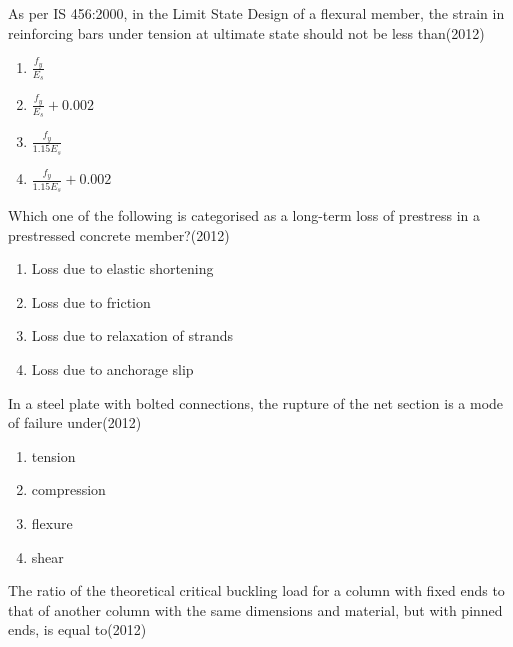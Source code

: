 	\item As per IS 456:2000, in the Limit State Design of a flexural member, the strain in reinforcing bars under tension at ultimate state should not be less than\hfill{(2012)}

  \begin{multicols}{4}
			\begin{enumerate}
\item $\frac{f_{y}}{E_{s}}$
\item $\frac{f_{y}}{E_{s}}+0.002$
\item $\frac{f_{y}}{1.15 E_{s}}$
\item $\frac{f_{y}}{1.15 E_{s}}+0.002$
\end{enumerate}
		\end{multicols}


	\item Which one of the following is categorised as a long-term loss of prestress in a prestressed concrete member?\hfill{(2012)}

   \begin{multicols}{1}
			\begin{enumerate}
  \item Loss due to elastic shortening
\item Loss due to friction
\item  Loss due to relaxation of strands
\item  Loss due to anchorage slip
\end{enumerate}
		\end{multicols}


	\item In a steel plate with bolted connections, the rupture of the net section is a mode of failure under\hfill{(2012)}

\begin{multicols}{1}
			\begin{enumerate}

\item  tension
\item compression
\item flexure
\item shear
   \end{enumerate}
		\end{multicols}


	\item The ratio of the theoretical critical buckling load for a column with fixed ends to that of another column with the same dimensions and material, but with pinned ends, is equal to\hfill{(2012)}


